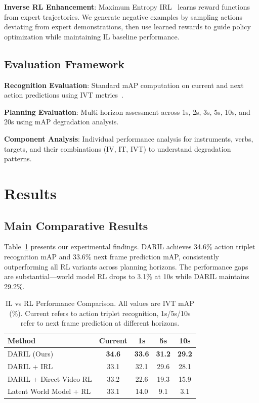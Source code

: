 \documentclass[runningheads]{llncs}
\begin{document}
\textbf{Inverse RL Enhancement}: Maximum Entropy IRL~\cite{ziebart2008maximum} learns reward functions from expert trajectories. We generate negative examples by sampling actions deviating from expert demonstrations, then use learned rewards to guide policy optimization while maintaining IL baseline performance.

\subsection{Evaluation Framework}

\textbf{Recognition Evaluation}: Standard mAP computation on current and next action predictions using IVT metrics~\cite{nwoye2022data}.

\textbf{Planning Evaluation}: Multi-horizon assessment across 1s, 2s, 3s, 5s, 10s, and 20s using mAP degradation analysis.

\textbf{Component Analysis}: Individual performance analysis for instruments, verbs, targets, and their combinations (IV, IT, IVT) to understand degradation patterns.

\section{Results}

\subsection{Main Comparative Results}

Table~\ref{tab:main_results} presents our experimental findings. DARIL achieves 34.6\% action triplet recognition mAP and 33.6\% next frame prediction mAP, consistently outperforming all RL variants across planning horizons. The performance gaps are substantial—world model RL drops to 3.1\% at 10s while DARIL maintains 29.2\%.

\begin{table}[h]
\centering
\caption{IL vs RL Performance Comparison. All values are IVT mAP (\%). Current refers to action triplet recognition, 1s/5s/10s refer to next frame prediction at different horizons.}
\label{tab:main_results}
\begin{tabular}{lcccc}
\toprule
\textbf{Method} & \textbf{Current} & \textbf{1s} & \textbf{5s} & \textbf{10s} \\
\midrule
DARIL (Ours) & \textbf{34.6} & \textbf{33.6} & \textbf{31.2} & \textbf{29.2} \\
DARIL + IRL & 33.1 & 32.1 & 29.6 & 28.1 \\
DARIL + Direct Video RL & 33.2 & 22.6 & 19.3 & 15.9 \\
Latent World Model + RL & 33.1 & 14.0 & 9.1 & 3.1 \\
\bottomrule
\end{tabular}
\end{table}
\end{document}
